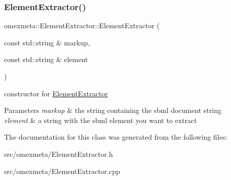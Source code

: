 \subsubsection{\texorpdfstring{Element\+Extractor()}{ElementExtractor()}}
{\footnotesize\ttfamily omexmeta\+::\+Element\+Extractor\+::\+Element\+Extractor (\begin{DoxyParamCaption}\item[{const std\+::string \&}]{markup,  }\item[{const std\+::string \&}]{element }\end{DoxyParamCaption})\hspace{0.3cm}{\ttfamily [explicit]}}



constructor for \hyperlink{classomexmeta_1_1ElementExtractor}{Element\+Extractor} 


\begin{DoxyParams}{Parameters}
{\em markup} & the string containing the sbml document string \\
\hline
{\em element} & a string with the sbml element you want to extract \\
\hline
\end{DoxyParams}


The documentation for this class was generated from the following files\+:\begin{DoxyCompactItemize}
\item 
src/omexmeta/Element\+Extractor.\+h\item 
src/omexmeta/Element\+Extractor.\+cpp\end{DoxyCompactItemize}
